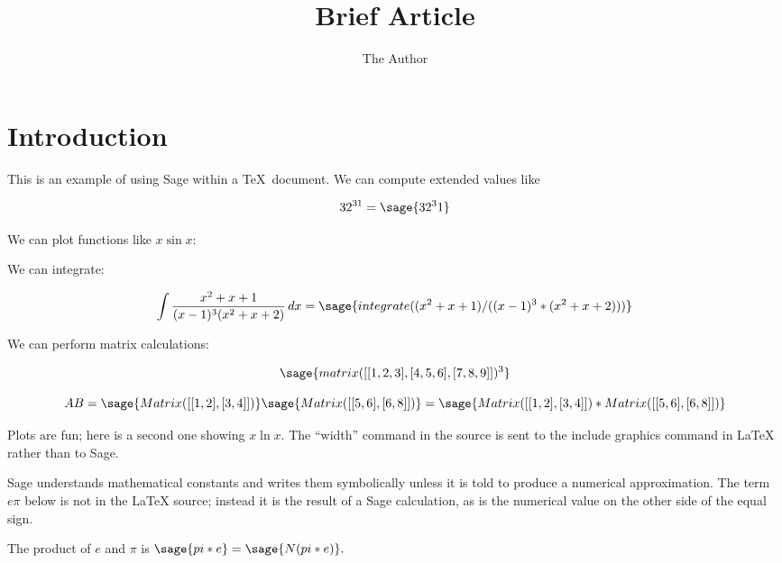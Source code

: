 \documentclass[11pt, oneside]{amsart}
\title{Brief Article}
\author{The Author}
\begin{document}
\maketitle
\section{Introduction}

This is an example of using Sage within a \TeX\ document. We can compute extended values like 

	$$32^{31} = \sage{32^31}$$
	
We can plot functions like $x \sin x$:

 
 We can integrate:
 
 $$\int {{x^2 + x + 1} \over {(x - 1)^3 (x^2 + x + 2)}}\,dx = \sage{integrate( (x^2 + x + 1) / ((x - 1)^3 * (x^2 + x + 2)) )}$$
 
 \newpage
 We can perform matrix calculations:
 
$$\sage{matrix([[1, 2, 3], [4, 5, 6], [7, 8, 9]])^3}$$

$$AB=  \sage{Matrix([[1, 2], [3, 4]])} \sage{Matrix([[5, 6], [6, 8]])} = \sage{Matrix([[1, 2], [3, 4]]) * Matrix([[5, 6], [6, 8]])}$$

Plots are fun; here is a second one showing $x \ln x$. The ``width'' command in the source is sent to the include graphics command in LaTeX rather than to Sage.


Sage understands mathematical constants and writes them symbolically unless it is told to produce a numerical approximation. The term $e \pi$ below is not in the LaTeX source; instead it is the result of a Sage calculation, as is the numerical value on the other side of the equal sign.

The product of $e$ and $\pi$ is $\sage{pi * e} = \sage{N(pi * e)}.$
\end{document}
